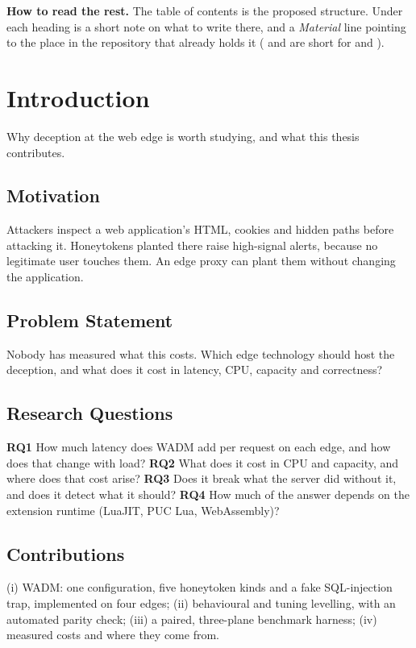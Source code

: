\documentclass{rptuma}
\begin{document}
\textbf{How to read the rest.} The table of contents is the proposed structure. Under each
heading is a short note on what to write there, and a \emph{Material} line pointing to the
place in the repository that already holds it ( and  are short for
 and ).

\frontmatternote

\tableofcontents
\cleardoublepage
{}

\chapter{Introduction}
Why deception at the web edge is worth studying, and what this thesis contributes.

\section{Motivation}
Attackers inspect a web application's HTML, cookies and hidden paths before attacking it.
Honeytokens planted there raise high-signal alerts, because no legitimate user touches them. An
edge proxy can plant them without changing the application.

\section{Problem Statement}
Nobody has measured what this costs. Which edge technology should host the deception, and what
does it cost in latency, CPU, capacity and correctness?

\section{Research Questions}
\label{sec:AB.rq}
\textbf{RQ1} How much latency does WADM add per request on each edge, and how does that change with
load? \textbf{RQ2} What does it cost in CPU and capacity, and where does that cost arise?
\textbf{RQ3} Does it break what the server did without it, and does it detect what it should?
\textbf{RQ4} How much of the answer depends on the extension runtime (LuaJIT, PUC Lua,
WebAssembly)?

\section{Contributions}
(i) WADM: one configuration, five honeytoken kinds and a fake SQL-injection trap, implemented on
four edges; (ii) behavioural and tuning levelling, with an automated parity check; (iii) a paired,
three-plane benchmark harness; (iv) measured costs and where they come from.
\end{document}
